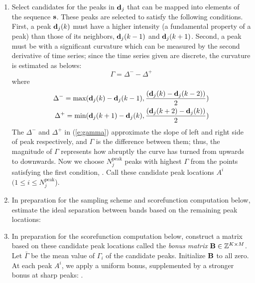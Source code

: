 \begin{enumerate}
\item Select candidates for the peaks in ${\mathbf{d}}_j$ that can be mapped into elements of the sequence ${\mathbf{s}}$. These peaks are selected to satisfy the following conditions. First, a peak ${\mathbf{d}}_j(k)$ must have a higher intensity (a fundamental property of a peak) than those of its neighbors, ${\mathbf{d}}_j(k-1)$ and ${\mathbf{d}}_j(k+1)$. Second, a peak must be with a significant curvature which can be measured by the second derivative of time series; since the time series given are discrete, the curvature is estimated as belows:
%
\begin{equation}\label{e:gamma}
\Gamma = \Delta^- - \Delta^+
\end{equation}
%
where
%
\begin{eqnarray}
\Delta^- = \max( {\mathbf{d}}_j(k)-{\mathbf{d}}_j(k-1), {{({\mathbf{d}}_j(k)-{\mathbf{d}}_j(k-2))}\over{2}}) \nonumber \\
\Delta^+ = \min( {\mathbf{d}}_j(k+1)-{\mathbf{d}}_j(k), {{({\mathbf{d}}_j(k+2)-{\mathbf{d}}_j(k))}\over{2}}) \nonumber
\end{eqnarray}
%
The $\Delta^-$ and $\Delta^+$ in (\ref{e:gamma}) approximate the slope of left and right side of peak respectively, and $\Gamma$ is the difference between them; thus, the magnitude of $\Gamma$ represents how abruptly the curve has turned from upwards to downwards. Now we choose $N^\textrm{peak}_j$ peaks with highest $\Gamma$ from the points satisfying the first condition, . Call these candidate peak locations $A^i$ $(1 \le i \le N^\textrm{peak}_j$).

\item In preparation for the sampling scheme and scorefunction computation below, estimate the ideal separation between bands based on the remaining peak locations: %

\item In preparation for the scorefunction computation below, construct a matrix based on these candidate peak locations called the \emph{bonus matrix} ${\mathbf{B}} \in \mathbb{Z}^{K \times M}$. Let $\bar{\Gamma}$ be the mean value of $\Gamma_i$ of the candidate peaks. Initialize ${\mathbf{B}}$ to all zero. At each peak $A^i$, we apply a uniform bonus, supplemented by a stronger bonus at sharp peaks: .


\end{enumerate}
